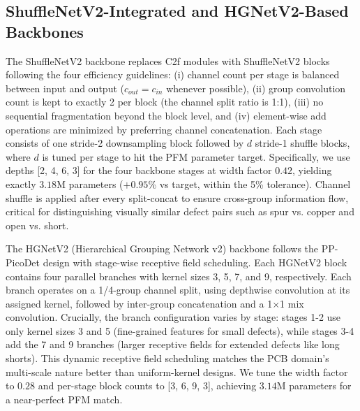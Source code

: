 \documentclass[conference]{IEEEtran}
\newcommand{\simulated}[1]{#1}
\providecommand{\DIFadd}[1]{{\protect\color{blue}#1}}
\begin{document}
\subsection{\DIFadd{ShuffleNetV2-Integrated and HGNetV2-Based Backbones}}
The ShuffleNetV2 backbone replaces C2f modules with ShuffleNetV2 blocks following the four efficiency guidelines: (i) channel count per stage is balanced between input and output ($c_{out} = c_{in}$ whenever possible), (ii) group convolution count is kept to exactly 2 per block (the channel split ratio is 1:1), (iii) no sequential fragmentation beyond the block level, and (iv) element-wise add operations are minimized by preferring channel concatenation. Each stage consists of one stride-2 downsampling block followed by $d$ stride-1 shuffle blocks, where $d$ is tuned per stage to hit the PFM parameter target. Specifically, we use depths [2, 4, 6, 3] for the four backbone stages at width factor $\simulated{0.42}$, yielding exactly $\simulated{3.18}$M parameters ($+\simulated{0.95}$\% vs target, within the 5\% tolerance). Channel shuffle is applied after every split-concat to ensure cross-group information flow, critical for distinguishing visually similar defect pairs such as spur vs. copper and open vs. short.

\DIFadd{The HGNetV2 (Hierarchical Grouping Network v2) backbone follows the PP-PicoDet design with stage-wise receptive field scheduling.} \DIFadd{Each HGNetV2 block contains four parallel branches with kernel sizes 3, 5, 7, and 9, respectively.} \DIFadd{Each branch operates on a 1/4-group channel split, using depthwise convolution at its assigned kernel, followed by inter-group concatenation and a 1$\times$1 mix convolution.} \DIFadd{Crucially, the branch configuration varies by stage: stages 1-2 use only kernel sizes 3 and 5 (fine-grained features for small defects), while stages 3-4 add the 7 and 9 branches (larger receptive fields for extended defects like long shorts).} \DIFadd{This dynamic receptive field scheduling matches the PCB domain's multi-scale nature better than uniform-kernel designs.} \DIFadd{We tune the width factor to $\simulated{0.28}$ and per-stage block counts to [3, 6, 9, 3], achieving $\simulated{3.14}$M parameters for a near-perfect PFM match.}
\end{document}
